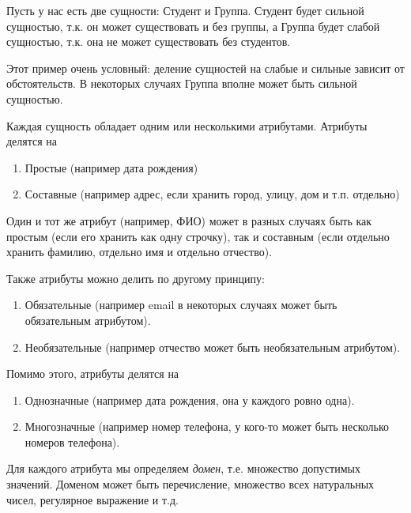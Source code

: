 \begin{example}
  Пусть у нас есть две сущности: Студент и Группа. Студент будет сильной
  сущностью, т.к. он может существовать и без группы, а Группа будет слабой
  сущностью, т.к. она не может существовать без студентов.

  Этот пример очень условный: деление сущностей на слабые и сильные зависит от
  обстоятельств. В некоторых случаях Группа вполне может быть сильной сущностью.
\end{example}

Каждая сущность обладает одним или несколькими атрибутами. Атрибуты делятся на
\begin{enumerate}
\item
  Простые (например дата рождения)

\item
  Составные (например адрес, если хранить город, улицу, дом и т.п. отдельно)
\end{enumerate}

\begin{remark}
  Один и тот же атрибут (например, ФИО) может в разных случаях быть как простым
  (если его хранить как одну строчку), так и составным (если отдельно хранить
  фамилию, отдельно имя и отдельно отчество).
\end{remark}

Также атрибуты можно делить по другому принципу:
\begin{enumerate}
\item
  Обязательные (например email в некоторых случаях может быть обязательным
  атрибутом).

\item
  Необязательные (например отчество может быть необязательным атрибутом).
\end{enumerate}

Помимо этого, атрибуты делятся на
\begin{enumerate}
\item
  Однозначные (например дата рождения, она у каждого ровно одна).

\item
  Многозначные (например номер телефона, у кого-то может быть несколько номеров
  телефона).
\end{enumerate}

Для каждого атрибута мы определяем \textit{домен}, т.е. множество допустимых значений.
Доменом может быть перечисление, множество всех натуральных чисел, регулярное
выражение и т.д.

